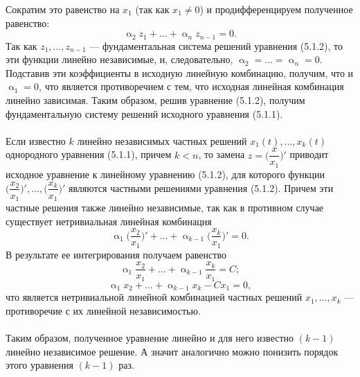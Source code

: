 \documentclass[a4paper, 12pt]{report}
\renewcommand{\alpha}{\upalpha}
\begin{document}
Сократим это равенство на $x_1$ (так как $x_1 \ne 0$) и продифференцируем полученное равенство: $$\alpha_2 z_1 + \ldots + \alpha_n z_{n-1} = 0.$$
Так как $z_1,\ldots, z_{n-1}$ --- фундаментальная система решений уравнения (5.1.2), то эти функции линейно независимые, и, следовательно, $\alpha_2 = \ldots = \alpha_n = 0$. Подставив эти коэффициенты в исходную линейную комбинацию, получим, что и $\alpha_1 = 0$, что является противоречием с тем, что исходная линейная комбинация линейно зависимая.
Таким образом, решив уравнение (5.1.2), получим фундаментальную систему решений исходного уравнения (5.1.1).\\\\
Если известно $k$ линейно независимых частных решений $x_1(t),\ldots, x_k(t)$ однородного уравнения (5.1.1), причем $k<n$, то замена $z = \Big(\dfrac{x}{x_1}\Big)'$ приводит исходное уравнение к линейному уравнению (5.1.2), для которого функции $\Big(\dfrac{x_2}{x_1}\Big)',\ldots, \Big(\dfrac{x_k}{x_1}\Big)'$ являются частными решениями уравнения (5.1.2). Причем эти частные решения также линейно независимые, так как в противном случае существует нетривиальная линейная комбинация $$\alpha_1\Big(\dfrac{x_2}{x_1}\Big)' + \ldots + \alpha_{k-1} \Big(\dfrac{x_k}{x_1}\Big)' = 0. $$
В результате ее интегрирования получаем равенство $$\alpha_1\dfrac{x_2}{x_1} + \ldots + \alpha _{k-1} \dfrac{x_k}{x_1} = C;$$
$$\alpha_1 x_2 + \ldots + \alpha_{k-1}x_k - Cx_1 = 0,$$
что является нетривиальной линейной комбинацией частных решений $x_1,\ldots, x_k$ --- противоречие с их линейной независимостью.\\\\
Таким образом, полученное уравнение линейно и для него известно $(k-1)$ линейно независимое решение. А значит аналогично можно понизить порядок этого уравнения $(k-1)$ раз.
\end{document}
